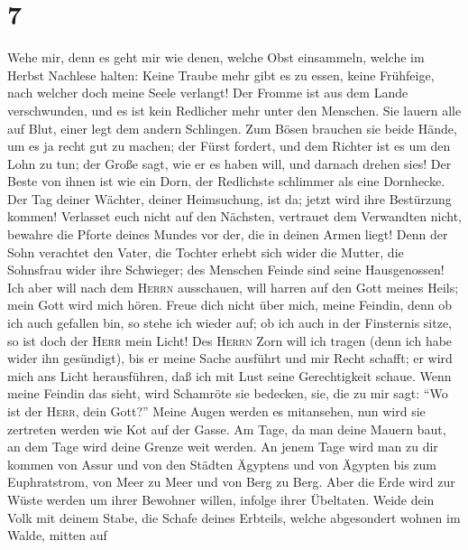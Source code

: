 \hypertarget{section-6}{%
\section{7}\label{section-6}}

 Wehe mir, denn es geht mir wie denen, welche Obst
einsammeln, welche im Herbst Nachlese halten: Keine Traube mehr gibt es
zu essen, keine Frühfeige, nach welcher doch meine Seele verlangt!
 Der Fromme ist aus dem Lande verschwunden, und es ist
kein Redlicher mehr unter den Menschen. Sie lauern alle auf Blut, einer
legt dem andern Schlingen.  Zum Bösen brauchen sie beide
Hände, um es ja recht gut zu machen; der Fürst fordert, und dem Richter
ist es um den Lohn zu tun; der Große sagt, wie er es haben will, und
darnach drehen sie\textquotesingle s!  Der Beste von ihnen
ist wie ein Dorn, der Redlichste schlimmer als eine Dornhecke. Der Tag
deiner Wächter, deiner Heimsuchung, ist da; jetzt wird ihre Bestürzung
kommen!  Verlasset euch nicht auf den Nächsten, vertrauet
dem Verwandten nicht, bewahre die Pforte deines Mundes vor der, die in
deinen Armen liegt!  Denn der Sohn verachtet den Vater,
die Tochter erhebt sich wider die Mutter, die Sohnsfrau wider ihre
Schwieger; des Menschen Feinde sind seine Hausgenossen! 
Ich aber will nach dem \textsc{Herrn} ausschauen, will harren auf den
Gott meines Heils; mein Gott wird mich hören.  Freue dich
nicht über mich, meine Feindin, denn ob ich auch gefallen bin, so stehe
ich wieder auf; ob ich auch in der Finsternis sitze, so ist doch der
\textsc{Herr} mein Licht!  Des \textsc{Herrn} Zorn will
ich tragen (denn ich habe wider ihn gesündigt), bis er meine Sache
ausführt und mir Recht schafft; er wird mich ans Licht herausführen, daß
ich mit Lust seine Gerechtigkeit schaue.  Wenn meine
Feindin das sieht, wird Schamröte sie bedecken, sie, die zu mir sagt:
``Wo ist der \textsc{Herr}, dein Gott?'' Meine Augen werden es
mitansehen, nun wird sie zertreten werden wie Kot auf der Gasse.
 Am Tage, da man deine Mauern baut, an dem Tage wird
deine Grenze weit werden.  An jenem Tage wird man zu dir
kommen von Assur und von den Städten Ägyptens und von Ägypten bis zum
Euphratstrom, von Meer zu Meer und von Berg zu Berg. 
Aber die Erde wird zur Wüste werden um ihrer Bewohner willen, infolge
ihrer Übeltaten.  Weide dein Volk mit deinem Stabe, die
Schafe deines Erbteils, welche abgesondert wohnen im Walde, mitten auf

